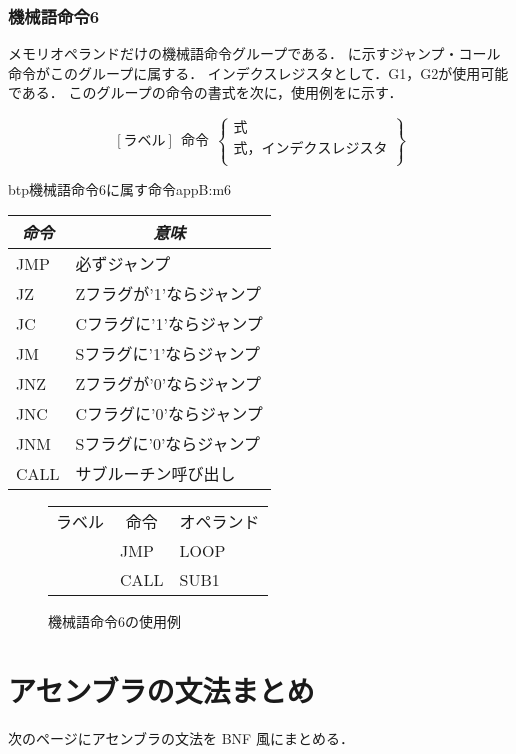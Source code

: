 \subsubsection{機械語命令6}
メモリオペランドだけの機械語命令グループである．
に示すジャンプ・コール命令がこのグループに属する．
インデクスレジスタとして．G1，G2が使用可能である．
このグループの命令の書式を次に，使用例をに示す．

{\small\[ %
[ラベル]~~命令~~\left\{
  \begin{array}{c}
   式 \\
   式，インデクスレジスタ \\
  \end{array}  
 \right\}
 \]}

\begin{mytable}{btp}{機械語命令6に属す命令}{appB:m6}
{\small\begin{tabular}{l|l}
\hline\hline
\multicolumn{1}{c|}{\it 命令} & \multicolumn{1}{c}{\it 意味} \\
\hline
JMP & 必ずジャンプ \\
JZ  & Zフラグが'1'ならジャンプ \\
JC  & Cフラグに'1'ならジャンプ \\
JM  & Sフラグに'1'ならジャンプ \\
JNZ & Zフラグが'0'ならジャンプ \\
JNC & Cフラグに'0'ならジャンプ \\
JNM & Sフラグに'0'ならジャンプ \\
CALL & サブルーチン呼び出し
\end{tabular}}
\end{mytable}

\begin{figure}[btp]
\begin{center}
{\tt\small\begin{tabular}{|l|l|l|}
\hline
\hline
\multicolumn{1}{|c|}{ラベル} & 
        \multicolumn{1}{c|}{命令} & \multicolumn{1}{c|}{オペランド} \\
  & JMP & LOOP \\
  & CALL & SUB1 \\
\hline
\end{tabular}}
\caption{機械語命令6の使用例}
\label{fig:appB:m6ex}
\end{center}
\end{figure}

\section{アセンブラの文法まとめ}
次のページにアセンブラの文法を BNF 風にまとめる．

